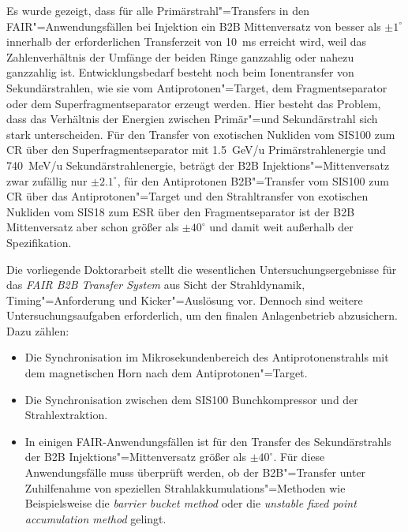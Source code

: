 Es wurde gezeigt, dass f\"ur alle Prim\"arstrahl"=Transfers in den FAIR"=Anwendungsf\"allen bei Injektion ein B2B Mittenversatz von besser als $\pm1^\circ$ innerhalb der erforderlichen Transferzeit von \SI{10}{\ms} erreicht wird, weil das Zahlenverh\"altnis der Umf\"ange der beiden Ringe ganzzahlig oder nahezu ganzzahlig ist.  Entwicklungsbedarf besteht noch beim Ionentransfer von Sekund\"arstrahlen, wie sie vom Antiprotonen"=Target, dem Fragmentseparator oder dem Superfragmentseparator erzeugt werden. Hier besteht das Problem, dass das Verh\"altnis der Energien zwischen Prim\"ar"=und Sekund\"arstrahl sich stark unterscheiden. F\"ur den Transfer von exotischen Nukliden vom SIS100 zum CR \"uber den Superfragmentseparator mit \SI{1.5}{GeV/u} Prim\"arstrahlenergie und \SI{740}{MeV/u} Sekund\"arstrahlenergie, betr\"agt der B2B Injektions"=Mittenversatz zwar zufällig nur $\pm2.1^\circ$, f\"ur den Antiprotonen B2B"=Transfer vom SIS100 zum CR \"uber das Antiprotonen"=Target und den Strahltransfer von exotischen Nukliden vom SIS18 zum ESR \"uber den Fragmentseparator ist der B2B Mittenversatz aber schon gr\"o\ss{}er als $\pm40^\circ$ und damit weit au\ss{}erhalb der Spezifikation.

Die vorliegende Doktorarbeit stellt die wesentlichen Untersuchungsergebnisse f\"ur das \textit{FAIR B2B Transfer System} aus Sicht der Strahldynamik, Timing"=Anforderung und Kicker"=Ausl\"osung vor. Dennoch sind weitere Untersuchungsaufgaben erforderlich, um den finalen Anlagenbetrieb abzusichern. Dazu z\"ahlen:
\begin{itemize}

\item Die Synchronisation im Mikrosekundenbereich des Antiprotonenstrahls mit dem magnetischen Horn nach dem Antiprotonen"=Target.
\item Die Synchronisation zwischen dem SIS100 Bunchkompressor und der Strahlextraktion.
\item In einigen FAIR-Anwendungsf\"allen ist f\"ur den Transfer des Sekund\"arstrahls der B2B Injektions"=Mittenversatz gr\"o\ss{}er als $\pm40^\circ$.  F\"ur diese Anwendungsf\"alle muss \"uberpr\"uft werden, ob der B2B"=Transfer unter Zuhilfenahme von speziellen Strahlakkumulations"=Methoden wie Beispielsweise die \textit{barrier bucket method} oder die \textit{unstable fixed point accumulation method} gelingt.
\end{itemize}

